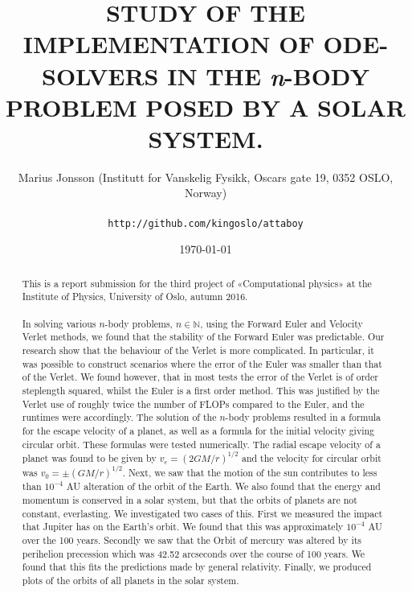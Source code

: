 \documentclass[11pt,english,a4paper]{article}
\author{\normalsize Marius Jonsson (Institutt for Vanskelig Fysikk, Oscars gate 19, 0352 OSLO, Norway) \\\\
\vspace{5px}
\normalsize \texttt{http://github.com/kingoslo/attaboy}}
\title{\bf \uppercase{Study of the implementation of ode-solvers in the} \textit{n}\uppercase{-body problem posed by a solar system.}}
\date{\normalsize \today}
\begin{document}
\maketitle
\begin{abstract} \normalsize This is a report submission for the third project of «Computational physics» at the Institute of Physics, University of Oslo, autumn 2016.\\
\\
In solving various $n$-body problems, $n \in \mathbb{N}$, using the Forward Euler and Velocity Verlet methods, we found that the stability of the Forward Euler was predictable. Our research show that the behaviour of the Verlet is more complicated. In particular, it was possible to construct scenarios where the error of the Euler was smaller than that of the Verlet. We found however, that in most tests the error of the Verlet is of order steplength squared, whilst the Euler is a first order method. This was justified by the Verlet use of roughly twice the number of FLOPs compared to the Euler, and the runtimes were accordingly. The solution of the $n$-body problems resulted in a formula for the escape velocity of a planet, as well as a formula for the initial velocity giving circular orbit. These formulas were tested numerically. The radial escape velocity of a planet was found to be given by $v_e = (2GM/r)^{1/2}$ and the velocity for circular orbit was $v_0 = \pm(GM/r)^{1/2}$. Next, we saw that the motion of the sun contributes to less than $10^{-4}$ AU alteration of the orbit of the Earth. We also found that the energy and momentum is conserved in a solar system, but that the orbits of planets are not constant, everlasting. We investigated two cases of this. First we measured the impact that Jupiter has on the Earth's orbit. We found that this was approximately $10^{-4}$ AU over the 100 years. Secondly we saw that the Orbit of mercury was altered by its perihelion precession which was 42.52 arcseconds over the course of 100 years. We found that this fits the predictions made by general relativity. Finally, we produced plots of the orbits of all planets in the solar system.
\end{abstract}
\lstset{
  xleftmargin=.2\textwidth, xrightmargin=.2\textwidth
}
\end{document}

